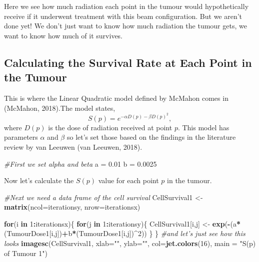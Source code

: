 \documentclass[]{article}
\newenvironment{Shaded}{\begin{snugshade}}{\end{snugshade}}
\newcommand{\KeywordTok}[1]{\textcolor[rgb]{0.13,0.29,0.53}{\textbf{#1}}}
\newcommand{\DataTypeTok}[1]{\textcolor[rgb]{0.13,0.29,0.53}{#1}}
\newcommand{\DecValTok}[1]{\textcolor[rgb]{0.00,0.00,0.81}{#1}}
\newcommand{\FloatTok}[1]{\textcolor[rgb]{0.00,0.00,0.81}{#1}}
\newcommand{\StringTok}[1]{\textcolor[rgb]{0.31,0.60,0.02}{#1}}
\newcommand{\CommentTok}[1]{\textcolor[rgb]{0.56,0.35,0.01}{\textit{#1}}}
\newcommand{\ControlFlowTok}[1]{\textcolor[rgb]{0.13,0.29,0.53}{\textbf{#1}}}
\newcommand{\OperatorTok}[1]{\textcolor[rgb]{0.81,0.36,0.00}{\textbf{#1}}}
\newcommand{\NormalTok}[1]{#1}
\begin{document}
Here we see how much radiation each point in the tumour would
hypothetically receive if it underwent treatment with this beam
configuration. But we aren't done yet! We don't just want to know how
much radiation the tumour gets, we want to know how much of it survives.

\subsection{Calculating the Survival Rate at Each Point in the
Tumour}\label{calculating-the-survival-rate-at-each-point-in-the-tumour}

This is where the Linear Quadratic model defined by McMahon comes in
(McMahon, 2018).The model states,
\[S(p)=e^{-\alpha D(p)-\beta D(p)^2},\] where \(D(p)\) is the dose of
radiation received at point \(p\). This model has parameters \(\alpha\)
and \(\beta\) so let's set those based on the findings in the literature
review by van Leeuwen (van Leeuwen, 2018).

\begin{Shaded}
\begin{Highlighting}[]
\CommentTok{#First we set alpha and beta}
\NormalTok{a =}\StringTok{ }\FloatTok{0.01}
\NormalTok{b =}\StringTok{ }\FloatTok{0.0025}
\end{Highlighting}
\end{Shaded}

Now let's calculate the \(S(p)\) value for each point \(p\) in the
tumour.

\begin{Shaded}
\begin{Highlighting}[]
\CommentTok{#Next we need a data frame of the cell survival}
\NormalTok{CellSurvival1 <-}\StringTok{ }\KeywordTok{matrix}\NormalTok{(}\DataTypeTok{ncol=}\NormalTok{iterationsy, }\DataTypeTok{nrow=}\NormalTok{iterationsx)}

\ControlFlowTok{for}\NormalTok{(i }\ControlFlowTok{in} \DecValTok{1}\OperatorTok{:}\NormalTok{iterationsx)\{}
  \ControlFlowTok{for}\NormalTok{(j }\ControlFlowTok{in} \DecValTok{1}\OperatorTok{:}\NormalTok{iterationsy)\{}
\NormalTok{    CellSurvival1[i,j] <-}\StringTok{ }\KeywordTok{exp}\NormalTok{(}\OperatorTok{-}\NormalTok{(a}\OperatorTok{*}\NormalTok{(TumourDose1[i,j])}\OperatorTok{+}\NormalTok{b}\OperatorTok{*}\NormalTok{(TumourDose1[i,j])}\OperatorTok{^}\DecValTok{2}\NormalTok{))}
\NormalTok{  \}}
\NormalTok{\}}
\CommentTok{#and let's just see how this looks}
\KeywordTok{imagesc}\NormalTok{(CellSurvival1, }\DataTypeTok{xlab=}\StringTok{""}\NormalTok{, }\DataTypeTok{ylab=}\StringTok{""}\NormalTok{, }\DataTypeTok{col=}\KeywordTok{jet.colors}\NormalTok{(}\DecValTok{16}\NormalTok{), }\DataTypeTok{main =} \StringTok{"S(p) of Tumour 1"}\NormalTok{)}
\end{Highlighting}
\end{Shaded}
\end{document}
